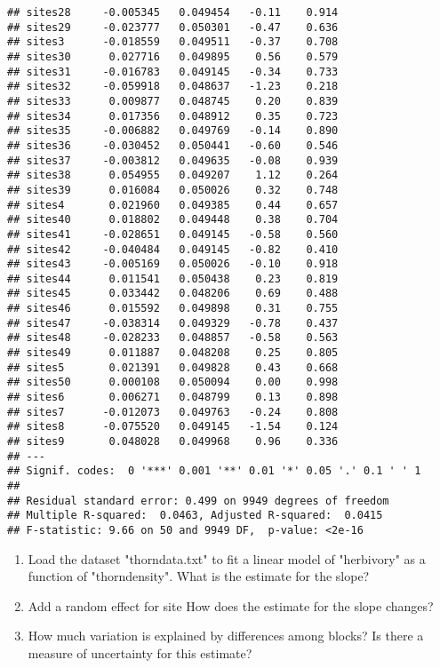 \documentclass[12pt,a4paper]{scrartcl}\usepackage[]{graphicx}\usepackage[]{color}
\makeatletter
\newenvironment{kframe}{%
 \def\at@end@of@kframe{}%
 \ifinner\ifhmode%
  \def\at@end@of@kframe{\end{minipage}}%
  \begin{minipage}{\columnwidth}%
 \fi\fi%
 \def\FrameCommand##1{\hskip\@totalleftmargin \hskip-\fboxsep
 \colorbox{shadecolor}{##1}\hskip-\fboxsep
     \hskip-\linewidth \hskip-\@totalleftmargin \hskip\columnwidth}%
 \MakeFramed {\advance\hsize-\width
   \@totalleftmargin\z@ \linewidth\hsize
   \@setminipage}}%
 {\par\unskip\endMakeFramed%
 \at@end@of@kframe}
\newenvironment{knitrout}{}{} %
\makeatother
\begin{document}
\begin{knitrout}
\begin{kframe}
\begin{verbatim}
## sites28     -0.005345   0.049454   -0.11    0.914    
## sites29     -0.023777   0.050301   -0.47    0.636    
## sites3      -0.018559   0.049511   -0.37    0.708    
## sites30      0.027716   0.049895    0.56    0.579    
## sites31     -0.016783   0.049145   -0.34    0.733    
## sites32     -0.059918   0.048637   -1.23    0.218    
## sites33      0.009877   0.048745    0.20    0.839    
## sites34      0.017356   0.048912    0.35    0.723    
## sites35     -0.006882   0.049769   -0.14    0.890    
## sites36     -0.030452   0.050441   -0.60    0.546    
## sites37     -0.003812   0.049635   -0.08    0.939    
## sites38      0.054955   0.049207    1.12    0.264    
## sites39      0.016084   0.050026    0.32    0.748    
## sites4       0.021960   0.049385    0.44    0.657    
## sites40      0.018802   0.049448    0.38    0.704    
## sites41     -0.028651   0.049145   -0.58    0.560    
## sites42     -0.040484   0.049145   -0.82    0.410    
## sites43     -0.005169   0.050026   -0.10    0.918    
## sites44      0.011541   0.050438    0.23    0.819    
## sites45      0.033442   0.048206    0.69    0.488    
## sites46      0.015592   0.049898    0.31    0.755    
## sites47     -0.038314   0.049329   -0.78    0.437    
## sites48     -0.028233   0.048857   -0.58    0.563    
## sites49      0.011887   0.048208    0.25    0.805    
## sites5       0.021391   0.049828    0.43    0.668    
## sites50      0.000108   0.050094    0.00    0.998    
## sites6       0.006271   0.048799    0.13    0.898    
## sites7      -0.012073   0.049763   -0.24    0.808    
## sites8      -0.075520   0.049145   -1.54    0.124    
## sites9       0.048028   0.049968    0.96    0.336    
## ---
## Signif. codes:  0 '***' 0.001 '**' 0.01 '*' 0.05 '.' 0.1 ' ' 1
## 
## Residual standard error: 0.499 on 9949 degrees of freedom
## Multiple R-squared:  0.0463,	Adjusted R-squared:  0.0415 
## F-statistic: 9.66 on 50 and 9949 DF,  p-value: <2e-16
\end{verbatim}
\end{kframe}
\end{knitrout}

\begin{Exercise}[difficulty=1, title={Reading a summary in lme4}]
\begin{enumerate}
  \item Load the dataset "thorndata.txt" to fit a linear model of "herbivory" as a function of "thorndensity". What is the estimate for the slope?\\
  \item Add a random effect for site How does the estimate for the slope changes?\\
  \item How much variation is explained by differences among blocks? Is there a measure of uncertainty for this estimate?
\end{enumerate}
\end{Exercise}
\end{document}
